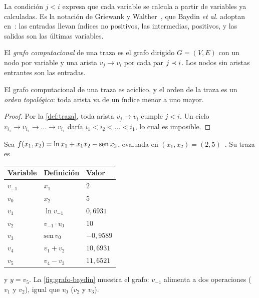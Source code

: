 La condición $j<i$ expresa que cada variable se calcula a partir de variables ya calculadas. Es la notación de Griewank y Walther~\cite[cap.~2]{gw}, que Baydin \emph{et al.} adoptan en~\cite[§3]{baydin}: las entradas llevan índices no positivos, las intermedias, positivos, y las salidas son las últimas variables.

\begin{definicion}\label{def:grafo}
El \emph{grafo computacional} de una traza es el grafo dirigido $G=(V,E)$ con un nodo por variable y una arista $v_j\to v_i$ por cada par $j\prec i$. Los nodos sin aristas entrantes son las entradas.
\end{definicion}

\begin{proposicion}\label{prop:aciclico}
El grafo computacional de una traza es acíclico, y el orden de la traza es un \emph{orden topológico}: toda arista va de un índice menor a uno mayor.
\end{proposicion}

\begin{proof}
Por la \cref{def:traza}, toda arista $v_j\to v_i$ cumple $j<i$. Un ciclo $v_{i_1}\to v_{i_2}\to\dots\to v_{i_1}$ daría $i_1<i_2<\dots<i_1$, lo cual es imposible.
\end{proof}

\begin{ejemplo}\label{ej:baydin}
Sea $f(x_1,x_2)=\ln x_1+x_1x_2-\operatorname{sen} x_2$, evaluada en $(x_1,x_2)=(2,5)$~\cite[§3, fig.~4 y tabla~2]{baydin}. Su traza es
\begin{center}\small
\begin{tabular}{@{}lll@{}}
\toprule
Variable & Definición & Valor \\
\midrule
$v_{-1}$ & $x_1$ & $2$ \\
$v_0$ & $x_2$ & $5$ \\
$v_1$ & $\ln v_{-1}$ & $0{,}6931$ \\
$v_2$ & $v_{-1}\cdot v_0$ & $10$ \\
$v_3$ & $\operatorname{sen} v_0$ & $-0{,}9589$ \\
$v_4$ & $v_1+v_2$ & $10{,}6931$ \\
$v_5$ & $v_4-v_3$ & $11{,}6521$ \\
\bottomrule
\end{tabular}
\end{center}
y $y=v_5$. La \cref{fig:grafo-baydin} muestra el grafo: $v_{-1}$ alimenta a dos operaciones ($v_1$ y $v_2$), igual que $v_0$ ($v_2$ y $v_3$).
\end{ejemplo}

